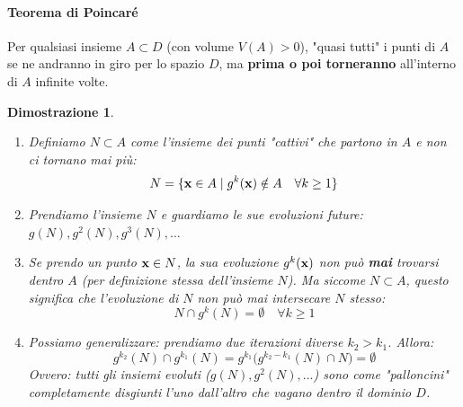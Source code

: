\documentclass[openany]{book}
\newtheorem*{dimostrazione}{Dimostrazione}
\theoremstyle{definition}
\theoremstyle{remark}
\begin{document}
\paragraph{Teorema di Poincaré}
Per qualsiasi insieme $A \subset D$ (con volume $V(A) > 0$), "quasi tutti" i punti di $A$ se ne andranno in giro per lo spazio $D$, ma \textbf{prima o poi torneranno} all'interno di $A$ infinite volte.

\begin{dimostrazione}
\begin{enumerate}
    \item Definiamo $N \subset A$ come l'insieme dei punti "cattivi" che partono in $A$ e non ci tornano \textit{mai} più:
    \begin{equation*}
        N = \{ \vb{x} \in A \mid g^k(\vb{x}) \notin A \quad \forall k \ge 1 \}
    \end{equation*}
    
    \item Prendiamo l'insieme $N$ e guardiamo le sue evoluzioni future: $g(N), g^2(N), g^3(N), \dots$
    
    \item Se prendo un punto $\vb{x} \in N$, la sua evoluzione $g^k(\vb{x})$ non può \textbf{mai} trovarsi dentro $A$ (per definizione stessa dell'insieme $N$). Ma siccome $N \subset A$, questo significa che l'evoluzione di $N$ non può mai intersecare $N$ stesso:
    \begin{equation*}
        N \cap g^k(N) = \emptyset \quad \forall k \ge 1
    \end{equation*}
    
    \item Possiamo generalizzare: prendiamo due iterazioni diverse $k_2 > k_1$. Allora:
    \begin{equation*}
        g^{k_2}(N) \cap g^{k_1}(N) = g^{k_1} \big( g^{k_2 - k_1}(N) \cap N \big) = \emptyset
    \end{equation*}
    Ovvero: tutti gli insiemi evoluti ($g(N), g^2(N), \dots$) sono come "palloncini" completamente disgiunti l'uno dall'altro che vagano dentro il dominio $D$.

    \begin{center}
\end{center}
\end{enumerate}
\end{dimostrazione}
\end{document}
